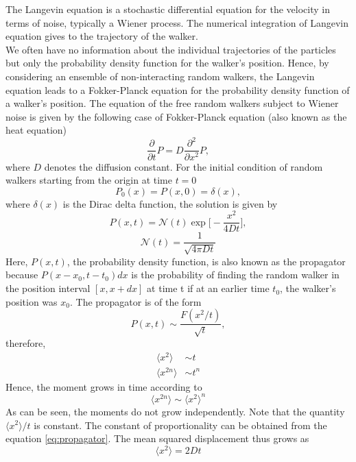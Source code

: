 \documentclass[12pt]{report}
\begin{document}
\begin{justify}
The Langevin equation is a stochastic differential equation for the velocity in terms of noise, typically a Wiener process. The numerical integration of Langevin equation gives to the trajectory of the walker.\\

We often have no information about the individual trajectories of the particles but only the probability density function for the walker's position. Hence, by considering an ensemble of non-interacting random walkers, the Langevin equation leads to a Fokker-Planck equation for the probability density function of a walker's position. The equation of the free random walkers subject to Wiener noise is given by the following case of Fokker-Planck equation (also known as the heat equation)
\begin{equation}
\frac{\partial}{\partial t} P = D \frac{\partial^2}{\partial x^2} P,
\end{equation}
where $D$ denotes the diffusion constant. For the initial condition of random walkers starting from the origin at time $t = 0$
\begin{equation}
P_0(x) = P(x, 0) = \delta(x),
\end{equation}
where $\delta(x)$ is the Dirac delta function, the solution is given by
\begin{equation}\label{eq:propagator}
P(x,t) = \mathcal{N}(t) \exp\Bigg[ -\frac{x^2}{4Dt}\Bigg],
\end{equation}
\begin{equation}
\mathcal{N}(t) = \frac{1}{\sqrt{4 \pi Dt}}
\end{equation}
Here, $P(x, t)$, the probability density function, is also known as the propagator because $P(x - x_0, t - t_0)dx$ is the probability of finding the random walker in the position interval $[x, x + dx]$ at time t if at an earlier time $t_0$, the walker's position was $x_0$. 
The propagator is of the form 
\begin{equation}
P(x, t) \sim \frac{F(x^2 /t)}{\sqrt{t}},
\end{equation} 
therefore,
\begin{equation}
\begin{split}
\langle x^2 \rangle &\sim   t\\
\langle x^{2n} \rangle &\sim t^n
\end{split}
\end{equation}
Hence, the moment grows in time according to 
\begin{equation}
\langle x^{2n} \rangle  \sim \langle x^2 \rangle^n
\end{equation}
As can be seen, the moments do not grow independently. Note that the quantity $\langle x^2 \rangle/t$ is constant. The constant of proportionality can be obtained from the equation \ref{eq:propagator}. The mean squared displacement thus grows as
\begin{equation}
\langle x^2 \rangle = 2Dt
\end{equation}


\end{justify}
\end{document}
